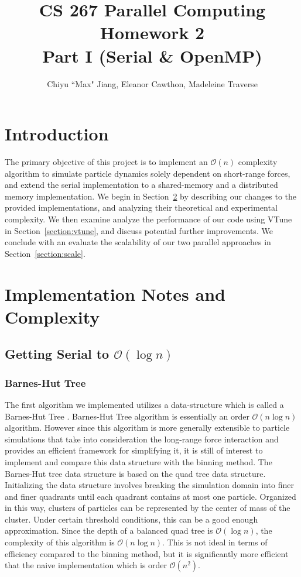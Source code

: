 \documentclass{article}
\title{CS 267 Parallel Computing Homework 2\\
\large{Part I (Serial \& OpenMP)}}
\author{Chiyu ``Max" Jiang, Eleanor Cawthon, Madeleine Traverse}
\begin{document}
\maketitle
\section{Introduction}
The primary objective of this project is to implement an $\mathcal{O}(n)$
complexity algorithm to simulate particle dynamics solely dependent on
short-range forces, and extend the serial implementation to a shared-memory
and a distributed memory implementation. We begin in
Section~\ref{section:impl} by describing our changes to the provided
implementations, and analyzing their theoretical and experimental complexity. We
then examine analyze the performance of our code using VTune in
Section~\ref{section:vtune}, and discuss potential further improvements.  We
conclude with an evaluate the scalability of our two parallel approaches in
Section~\ref{section:scale}.
\section{Implementation Notes and
Complexity}\label{section:impl}
\subsection{Getting Serial to $\mathcal{O}(\log n)$}\label{subection:serial}
\subsubsection{Barnes-Hut Tree}
The first algorithm we implemented utilizes a data-structure which is
called a Barnes-Hut Tree \cite{barnes1986hierarchical}.
Barnes-Hut Tree algorithm is essentially an order $\mathcal{O}(n\log n)$
algorithm. However since this algorithm is more generally extensible to particle
simulations that take into consideration the long-range force interaction and
provides an efficient framework for simplifying it, it is still of interest to
implement and compare this data structure with the binning method. The
Barnes-Hut tree data structure is based on the quad tree data structure.
Initializing the data structure involves breaking the simulation domain
into finer and finer quadrants until each quadrant contains at most one
particle. Organized in this way, clusters of particles can be represented by the
center of mass of the cluster. Under certain threshold conditions, this can
be a good enough approximation.  Since the depth of a balanced quad tree is
$\mathcal{O}(\log n)$, the complexity of this algorithm is $\mathcal{O}(n\log
n)$. This is not ideal in terms of efficiency compared to the binning method,
but it is significantly more efficient that the naive implementation which is
order $\mathcal{O}(n^2)$.
\end{document}
